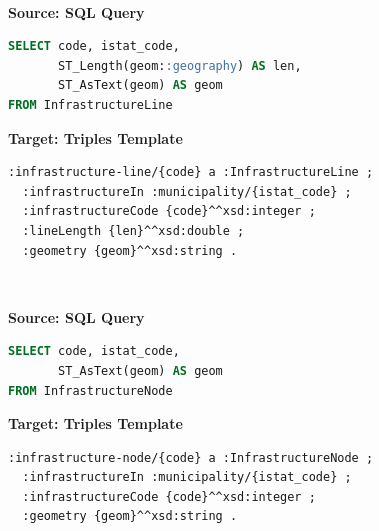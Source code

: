 \begin{figure}[ht!]
  \vspace*{-1mm}
  \textbf{\small{}} \\
  \begin{minipage}[t]{0.48\textwidth}
    \centering
    \textbf{\scriptsize Source: SQL Query}
\begin{lstlisting}[language=SQL]
SELECT code, istat_code,
       ST_Length(geom::geography) AS len,
       ST_AsText(geom) AS geom
FROM InfrastructureLine
\end{lstlisting}
  \end{minipage}
  \hfill
  \begin{minipage}[t]{0.52\textwidth}
    \centering
    \textbf{\scriptsize Target: Triples Template}
\begin{lstlisting}[language=Turtle]
:infrastructure-line/{code} a :InfrastructureLine ;
  :infrastructureIn :municipality/{istat_code} ;
  :infrastructureCode {code}^^xsd:integer ;
  :lineLength {len}^^xsd:double ;
  :geometry {geom}^^xsd:string . 
\end{lstlisting}
  \end{minipage}
  \vspace*{-4mm}
\end{figure}

\begin{figure}[ht!]
  \vspace*{-1mm}
  \textbf{\small{}} \\
  \begin{minipage}[t]{0.48\textwidth}
    \centering
    \textbf{\scriptsize Source: SQL Query}
\begin{lstlisting}[language=SQL]
SELECT code, istat_code,
       ST_AsText(geom) AS geom
FROM InfrastructureNode
\end{lstlisting}
  \end{minipage}
  \hfill
  \begin{minipage}[t]{0.52\textwidth}
    \centering
    \textbf{\scriptsize Target: Triples Template}
\begin{lstlisting}[language=Turtle]
:infrastructure-node/{code} a :InfrastructureNode ;
  :infrastructureIn :municipality/{istat_code} ;
  :infrastructureCode {code}^^xsd:integer ;
  :geometry {geom}^^xsd:string . 
\end{lstlisting}
  \end{minipage}
  \vspace*{-4mm}
\end{figure}

